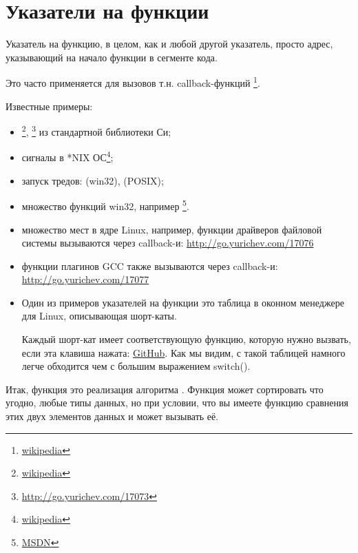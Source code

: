 \newcommand{\comp}{\TT{comp()}\xspace}
\section{Указатели на функции}
\label{sec:pointerstofunctions}

\myindex{\CLanguageElements!\Pointers}
Указатель на функцию, в целом, как и любой другой указатель, просто адрес, указывающий на начало функции 
в сегменте кода.

Это часто применяется для вызовов т.н. callback-функций \footnote{\href{http://go.yurichev.com/17071}{wikipedia}}.

Известные примеры:

\begin{itemize}
\item \qsort\footnote{\href{http://go.yurichev.com/17072}{wikipedia}},
{}\footnote{\url{http://go.yurichev.com/17073}} из стандартной библиотеки Си; 

\item сигналы в *NIX ОС\footnote{\href{http://go.yurichev.com/17074}{wikipedia}};

\item запуск тредов:  (win32),  (POSIX);

\item множество функций win32, например \footnote{\href{http://go.yurichev.com/17075}{MSDN}}.

\item множество мест в ядре Linux, например, функции драйверов файловой системы вызываются
через callback-и: 
\url{http://go.yurichev.com/17076}

\item функции плагинов GCC также вызываются через callback-и: 
\url{http://go.yurichev.com/17077}

\item Один из примеров указателей на функции это таблица в оконном менеджере  для Linux, описывающая шорт-каты.

Каждый шорт-кат имеет соответствующую функцию, которую нужно вызвать, если эта клавиша нажата: \href{http://go.yurichev.com/17078}{GitHub}.
Как мы видим, с такой таблицей намного легче обходится чем с большим выражением switch().

\end{itemize}

Итак, функция \qsort это реализация алгоритма . 
Функция может сортировать что угодно, 
любые типы данных, но при условии, что вы имеете функцию сравнения этих двух элементов данных и 
\qsort может вызывать её.

